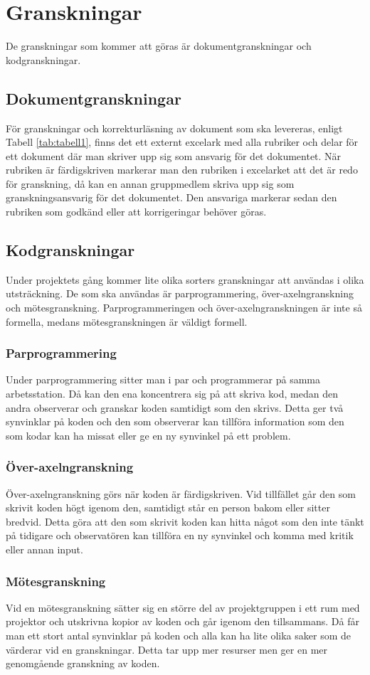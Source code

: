 \section{Granskningar}
De granskningar som kommer att göras är dokumentgranskningar och kodgranskningar.
\subsection{Dokumentgranskningar}
För granskningar och korrekturläsning av dokument som ska levereras, enligt Tabell \ref{tab:tabell1}, finns det ett externt excelark med alla rubriker och delar för ett dokument där man skriver upp sig som ansvarig för det dokumentet. När rubriken är färdigskriven markerar man den rubriken i excelarket att det är redo för granskning, då kan en annan gruppmedlem skriva upp sig som granskningsansvarig för det dokumentet. Den ansvariga markerar sedan den rubriken som godkänd eller att korrigeringar behöver göras.
\subsection{Kodgranskningar}
Under projektets gång kommer lite olika sorters granskningar att användas i olika utsträckning. De som ska användas är parprogrammering, över-axelngranskning och mötesgranskning. Parprogrammeringen och över-axelngranskningen är inte så formella, medans mötesgranskningen är väldigt formell.
\subsubsection{Parprogrammering}
Under parprogrammering sitter man i par och programmerar på samma arbetsstation. Då kan den ena koncentrera sig på att skriva kod, medan den andra observerar och granskar koden samtidigt som den skrivs. Detta ger två synvinklar på koden och den som observerar kan tillföra information som den som kodar kan ha missat eller ge en ny synvinkel på ett problem.
\subsubsection{Över-axelngranskning}
Över-axelngranskning görs när koden är färdigskriven. Vid tillfället går den som skrivit koden högt igenom den, samtidigt står en person bakom eller sitter bredvid. Detta göra att den som skrivit koden kan hitta något som den inte tänkt på tidigare och observatören kan tillföra en ny synvinkel och komma med kritik eller annan input.
\subsubsection{Mötesgranskning}
Vid en mötesgranskning sätter sig en större del av projektgruppen i ett rum med projektor och utskrivna kopior av koden och går igenom den tillsammans. Då får man ett stort antal synvinklar på koden och alla kan ha lite olika saker som de värderar vid en granskningar. Detta tar upp mer resurser men ger en mer genomgående granskning av koden.